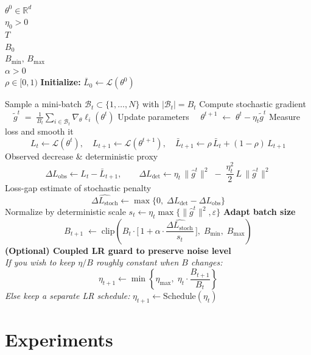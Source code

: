 \documentclass[12pt]{article}
\begin{document}
\begin{algorithm}[H]
\caption{LAM-Batches Training}
\label{alg:SGD-adaptive-B}
\begin{algorithmic}[1]
  \Require
    \\
    $\theta^0 \in \mathbb{R}^d$  \\
    $\eta_0 > 0$  \\
    $T$  \\
    $B_0$  \\
    $B_{\min},\,B_{\max}$  \\
    $\alpha>0$  \\
    $\rho \in [0,1)$ 
  \State \textbf{Initialize:} $\bar L_0 \gets \mathcal{L}(\theta^0)$

    \State Sample a mini-batch $\mathcal{B}_t \subset \{1,\dots,N\}$ with $|\mathcal{B}_t| = B_t$
    \State Compute stochastic gradient $\quad \tilde g^t \;=\; \frac{1}{B_t}\sum_{i \in \mathcal{B}_t} \nabla_\theta \ell_i(\theta^t)$
    \State Update parameters $\quad \theta^{t+1} \;\gets\; \theta^t - \eta_t \tilde g^t$
    \State Measure loss and smooth it
      \[
      L_t \gets \mathcal{L}(\theta^t), \quad L_{t+1} \gets \mathcal{L}(\theta^{t+1}), \quad
      \bar L_{t+1} \gets \rho\,\bar L_t + (1-\rho)\,L_{t+1}
      \]
    \State Observed decrease \& deterministic proxy
      \[
      \Delta L_{\mathrm{obs}} \gets L_t - \bar L_{t+1}, \qquad
      \Delta L_{\mathrm{det}} \gets \eta_t \,\|\widehat g^t\|^2 \;-\; \frac{\eta_t^2}{2}\,L\,\|\widehat g^t\|^2
      \]
    \State Loss-gap estimate of stochastic penalty
      \[
      \widehat{\Delta L_{\mathrm{stoch}}} \gets \max\!\big\{0,\; \Delta L_{\mathrm{det}} - \Delta L_{\mathrm{obs}}\big\}
      \]
    \State Normalize by deterministic scale $s_t \gets \eta_t \max\{\|\widehat g^t\|^2,\varepsilon\}$ 
    \State \textbf{Adapt batch size}
      \[
      B_{t+1} \;\gets\; \mathrm{clip}\!\left(
        B_t \cdot \Big[\,1 + \alpha \cdot \frac{\widehat{\Delta L_{\mathrm{stoch}}}}{s_t}\,\Big],
        \; B_{\min},\; B_{\max}
      \right)
      \]
    \State \textbf{(Optional) Coupled LR guard to preserve noise level} \\
      \hspace*{1.25em} \textit{If you wish to keep $\eta/B$ roughly constant when $B$ changes:}
      \[
      \eta_{t+1} \gets \min\!\left\{\eta_{\max},\; \eta_t \cdot \frac{B_{t+1}}{B_t} \right\}
      \]
      \textit{Else keep a separate LR schedule: } $\eta_{t+1} \gets \text{Schedule}(\eta_t)$
  \EndFor
\end{algorithmic}
\end{algorithm}



\section{Experiments}
\subsection{}
\end{document}
